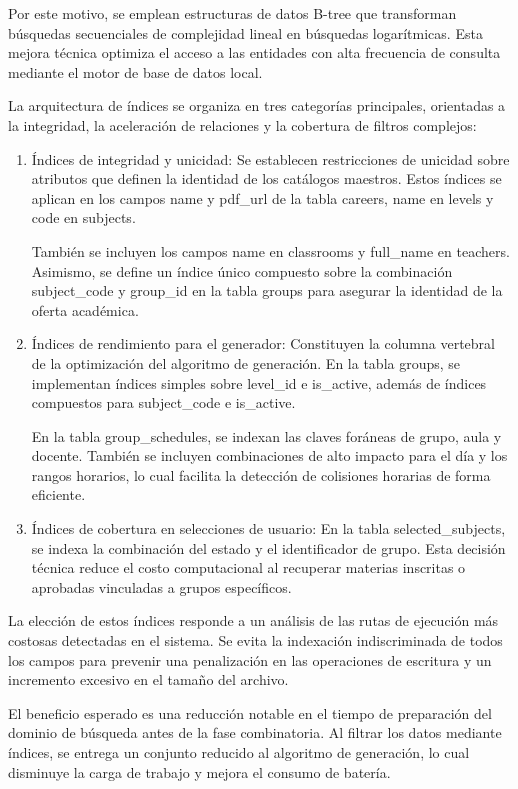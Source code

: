 Por este motivo, se emplean estructuras de datos B-tree que transforman búsquedas secuenciales de complejidad lineal en búsquedas logarítmicas. Esta mejora técnica optimiza el acceso a las entidades con alta frecuencia de consulta mediante el motor de base de datos local.

La arquitectura de índices se organiza en tres categorías principales, orientadas a la integridad, la aceleración de relaciones y la cobertura de filtros complejos:

\begin{enumerate}
  \item Índices de integridad y unicidad: Se establecen restricciones de unicidad sobre atributos que definen la identidad de los catálogos maestros. Estos índices se aplican en los campos name y pdf\_url de la tabla careers, name en levels y code en subjects.
  
  También se incluyen los campos name en classrooms y full\_name en teachers. Asimismo, se define un índice único compuesto sobre la combinación subject\_code y group\_id en la tabla groups para asegurar la identidad de la oferta académica.

  \item Índices de rendimiento para el generador: Constituyen la columna vertebral de la optimización del algoritmo de generación. En la tabla groups, se implementan índices simples sobre level\_id e is\_active, además de índices compuestos para subject\_code e is\_active.
  
  En la tabla group\_schedules, se indexan las claves foráneas de grupo, aula y docente. También se incluyen combinaciones de alto impacto para el día y los rangos horarios, lo cual facilita la detección de colisiones horarias de forma eficiente.

  \item Índices de cobertura en selecciones de usuario: En la tabla selected\_subjects, se indexa la combinación del estado y el identificador de grupo. Esta decisión técnica reduce el costo computacional al recuperar materias inscritas o aprobadas vinculadas a grupos específicos.
\end{enumerate}

La elección de estos índices responde a un análisis de las rutas de ejecución más costosas detectadas en el sistema. Se evita la indexación indiscriminada de todos los campos para prevenir una penalización en las operaciones de escritura y un incremento excesivo en el tamaño del archivo.

El beneficio esperado es una reducción notable en el tiempo de preparación del dominio de búsqueda antes de la fase combinatoria. Al filtrar los datos mediante índices, se entrega un conjunto reducido al algoritmo de generación, lo cual disminuye la carga de trabajo y mejora el consumo de batería.

